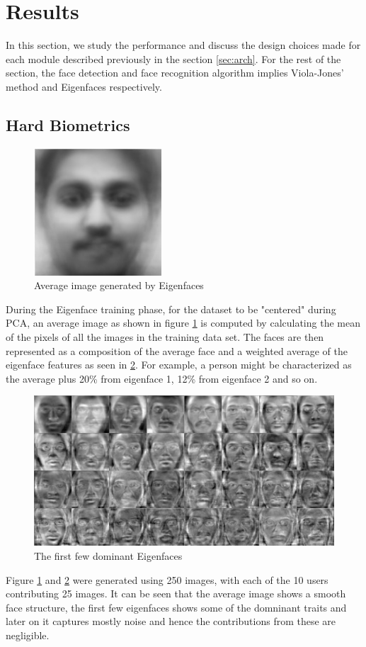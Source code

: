 \documentclass[%
        final,
        notitlepage,
        narroweqnarray,
        inline,
        ]{ieee}
\begin{document}
\section{Results} \label{sec:results}
In this section, we study the performance and discuss the design choices made for each module described previously in the section \ref{sec:arch}.
For the rest of the section, the face detection and face recognition algorithm implies Viola-Jones' method and Eigenfaces respectively.

\subsection{Hard Biometrics}
\begin{figure}[h!]
	\centering
	\includegraphics[scale=0.5]{img/avg.jpeg}
	\caption{Average image generated by Eigenfaces}
	\label{fig:avg}
\end{figure}
During the Eigenface training phase, for the dataset to be "centered" during PCA, an average image as shown in figure \ref{fig:avg} is computed by calculating the mean of the pixels of all the images in the training data set. 
The faces are then represented as a composition of the average face and a weighted average of the eigenface features as seen in \ref{fig:eigen}.
For example, a person might be characterized as the average plus 20\% from eigenface 1, 12\% from eigenface 2 and so on.
\begin{figure}[h!]
	\centering
	\includegraphics[scale=0.15]{img/eigen.png}
	\caption{The first few dominant Eigenfaces}
	\label{fig:eigen}
\end{figure}
Figure \ref{fig:avg} and \ref{fig:eigen} were generated using 250 images, with each of the 10 users contributing 25 images.
It can be seen that the average image shows a smooth face structure, the first few eigenfaces shows some of the domninant traits and later on it captures mostly noise and hence the contributions from these are negligible.
\end{document}

